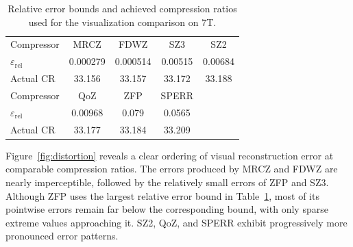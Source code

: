 \begin{table}[htb]
    \centering
    \caption{Relative error bounds and achieved compression ratios used for the visualization comparison on 7T.}
    \label{tab:error-bound-visualization}
    \footnotesize
    \setlength{\tabcolsep}{3pt}
    \begin{tabular}{lcccc}
        \toprule
        Compressor & MRCZ & FDWZ & SZ3 & SZ2 \\
        $\varepsilon_{\mathrm{rel}}$ & 0.000279 & 0.000514 & 0.00515 & 0.00684 \\
        Actual CR & 33.156 & 33.157 & 33.172 & 33.188 \\
        \midrule
        Compressor & QoZ & ZFP & SPERR & \\
        $\varepsilon_{\mathrm{rel}}$ & 0.00968 & 0.079 & 0.0565 & \\
        Actual CR & 33.177 & 33.184 & 33.209 & \\
        \bottomrule
    \end{tabular}
\end{table}

Figure~\ref{fig:distortion} reveals a clear ordering of visual reconstruction error at comparable compression ratios. The errors produced by MRCZ and FDWZ are nearly imperceptible, followed by the relatively small errors of ZFP and SZ3. Although ZFP uses the largest relative error bound in Table~\ref{tab:error-bound-visualization}, most of its pointwise errors remain far below the corresponding bound, with only sparse extreme values approaching it. SZ2, QoZ, and SPERR exhibit progressively more pronounced error patterns.
